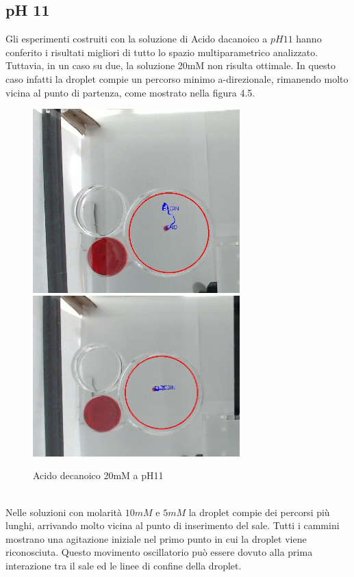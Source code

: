 \subsection{pH 11}
Gli esperimenti costruiti con la soluzione di Acido dacanoico a $pH11$ hanno conferito i risultati migliori di tutto lo spazio multiparametrico analizzato. Tuttavia, in un caso su due, la soluzione 20mM non risulta ottimale. In questo caso infatti la droplet compie un percorso minimo a-direzionale, rimanendo molto vicina al punto di partenza, come mostrato nella figura 4.5. 
\begin{figure}[h]
	\centering
   		{\includegraphics[width=8cm]{immagini/20mMpH11-2.jpg}}
 	\hspace{2mm}   	
		{\includegraphics[width=8cm]{immagini/20mMpH11-1.jpg}}
	\caption{Acido decanoico 20mM a pH11}
\end{figure}
\\Nelle soluzioni con molarità $10mM$ e $5mM$ la droplet compie dei percorsi più lunghi, arrivando molto vicina al punto di inserimento del sale. Tutti i cammini mostrano una agitazione iniziale nel primo punto in cui la droplet viene riconosciuta. Questo movimento oscillatorio può essere dovuto alla prima interazione tra il sale ed le linee di confine della droplet.

